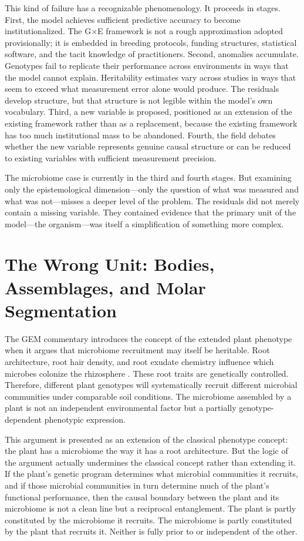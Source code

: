 \documentclass[11pt, a4paper]{article}
\begin{document}
This kind of failure has a recognizable phenomenology. It proceeds in stages. First, the model achieves sufficient predictive accuracy to become institutionalized. The G$\times$E framework is not a rough approximation adopted provisionally; it is embedded in breeding protocols, funding structures, statistical software, and the tacit knowledge of practitioners. Second, anomalies accumulate. Genotypes fail to replicate their performance across environments in ways that the model cannot explain. Heritability estimates vary across studies in ways that seem to exceed what measurement error alone would produce. The residuals develop structure, but that structure is not legible within the model's own vocabulary. Third, a new variable is proposed, positioned as an extension of the existing framework rather than as a replacement, because the existing framework has too much institutional mass to be abandoned. Fourth, the field debates whether the new variable represents genuine causal structure or can be reduced to existing variables with sufficient measurement precision.

The microbiome case is currently in the third and fourth stages. But examining only the epistemological dimension---only the question of what was measured and what was not---misses a deeper level of the problem. The residuals did not merely contain a missing variable. They contained evidence that the primary unit of the model---the organism---was itself a simplification of something more complex.

\section{The Wrong Unit: Bodies, Assemblages, and Molar Segmentation}

The GEM commentary introduces the concept of the extended plant phenotype when it argues that microbiome recruitment may itself be heritable. Root architecture, root hair density, and root exudate chemistry influence which microbes colonize the rhizosphere \citep{zancarini2024}. These root traits are genetically controlled. Therefore, different plant genotypes will systematically recruit different microbial communities under comparable soil conditions. The microbiome assembled by a plant is not an independent environmental factor but a partially genotype-dependent phenotypic expression.

This argument is presented as an extension of the classical phenotype concept: the plant has a microbiome the way it has a root architecture. But the logic of the argument actually undermines the classical concept rather than extending it. If the plant's genetic program determines what microbial communities it recruits, and if those microbial communities in turn determine much of the plant's functional performance, then the causal boundary between the plant and its microbiome is not a clean line but a reciprocal entanglement. The plant is partly constituted by the microbiome it recruits. The microbiome is partly constituted by the plant that recruits it. Neither is fully prior to or independent of the other.
\end{document}
